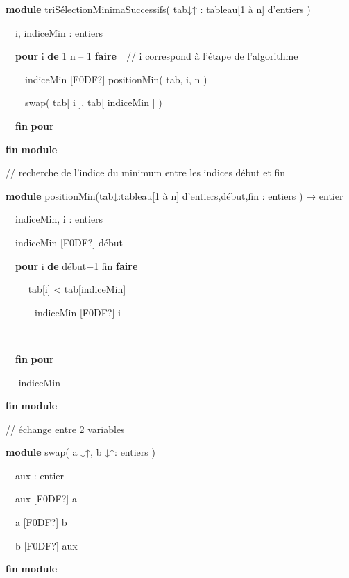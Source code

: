 {\sffamily
\textbf{module} triSélectionMinimaSuccessifs( tab↓↑ : tableau[1 à n]
d’entiers )}

{\sffamily
\ \ i, indiceMin : entiers}

{\sffamily
\ \ \textbf{pour} i \textbf{de} 1  n – 1
\textbf{faire}\ \ // i correspond à l’étape de l’algorithme}

{\sffamily
\ \ \ \ indiceMin \textrm{[F0DF?]} positionMin( tab, i, n )\ \ }

{\sffamily
\ \ \ \ {swap( tab[ i ], tab[ indiceMin ] )}}

{\sffamily
{\ \ }{\textbf{fin}}{
}{\textbf{pour}}}

{\sffamily
{\textbf{fin}}{
}{\textbf{module}}}


\bigskip

{\sffamily
// recherche de l’indice du minimum entre les indices début et fin }

{\sffamily
\textbf{module} positionMin(tab↓:tableau[1 à n] d’entiers,début,fin :
entiers ) → entier}

{\sffamily
\ \ indiceMin, i : entiers}

{\sffamily
\ \ indiceMin {\textrm{[F0DF?]}} début}

{\sffamily
\ \ \textbf{pour} i \textbf{de} début+1  fin
\textbf{faire}\ \ \ \ }

{\sffamily
\ \ \ \  tab[i] {\textless} tab[indiceMin]
}

{\sffamily
\ \ \ \ \ \ indiceMin {\textrm{[F0DF?]}} i}

{\sffamily
\ \ \ \  }

{\sffamily
{\ \ }{\textbf{fin}}{
}{\textbf{pour}}}

{\sffamily
\ \  indiceMin}

{\sffamily
{\textbf{fin}}{
}{\textbf{module}}}


\bigskip

{\sffamily
// échange entre 2 variables}

{\sffamily
\textbf{module} swap( a ↓↑, b ↓↑: entiers )}

{\sffamily
\ \ aux : entier}

{\sffamily
\ \ aux {\textrm{[F0DF?]}} a}

{\sffamily
\ \ a {\textrm{[F0DF?]}} b}

{\sffamily
\ \ b {\textrm{[F0DF?]}} aux}

{\sffamily
{\textbf{fin}}{
}{\textbf{module}}}



